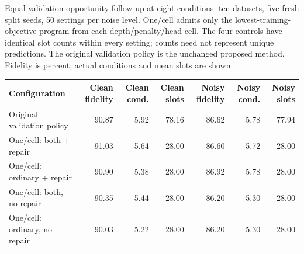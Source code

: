 \begin{kbtable}
\centering
\caption{Equal-validation-opportunity follow-up at eight conditions: ten datasets, five fresh split seeds, 50 settings per noise level. One/cell admits only the lowest-training-objective program from each depth/penalty/head cell. The four controls have identical slot counts within every setting; counts need not represent unique predictions. The original validation policy is the unchanged proposed method. Fidelity is percent; actual conditions and mean slots are shown.}
\label{tab:followup_slots}
\small
\begin{adjustbox}{max width=\linewidth}
\begin{tabular}{lrrrrrr}
\toprule
Configuration & Clean fidelity & Clean cond. & Clean slots & Noisy fidelity & Noisy cond. & Noisy slots \\
\midrule
Original validation policy & 90.87 & 5.92 & 78.16 & 86.62 & 5.78 & 77.94 \\
One/cell: both + repair & 91.03 & 5.64 & 28.00 & 86.60 & 5.72 & 28.00 \\
One/cell: ordinary + repair & 90.90 & 5.38 & 28.00 & 86.92 & 5.78 & 28.00 \\
One/cell: both, no repair & 90.35 & 5.44 & 28.00 & 86.20 & 5.30 & 28.00 \\
One/cell: ordinary, no repair & 90.03 & 5.22 & 28.00 & 86.20 & 5.30 & 28.00 \\
\bottomrule
\end{tabular}
\end{adjustbox}
\end{kbtable}
